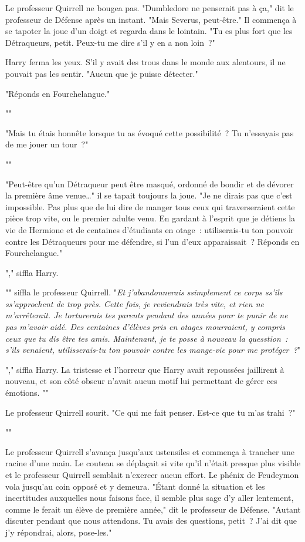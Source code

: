 Le professeur Quirrell ne bougea pas. "Dumbledore ne penserait pas à ça," dit le professeur de Défense après un instant. "Mais Severus, peut-être." Il commença à se tapoter la joue d'un doigt et regarda dans le lointain. "Tu es plus fort que les Détraqueurs, petit. Peux-tu me dire s'il y en a non loin~?"

Harry ferma les yeux. S'il y avait des trous dans le monde aux alentours, il ne pouvait pas les sentir. "Aucun que je puisse détecter."

"Réponds en Fourchelangue."

""

"Mais tu étais honnête lorsque tu as évoqué cette possibilité~? Tu n'essayais pas de me jouer un tour~?"

""

"Peut-être qu'un Détraqueur peut être masqué, ordonné de bondir et de dévorer la première âme venue…" il se tapait toujours la joue. "Je ne dirais pas que c'est impossible. Pas plus que de lui dire de manger tous ceux qui traverseraient cette pièce trop vite, ou le premier adulte venu. En gardant à l'esprit que je détiens la vie de Hermione et de centaines d'étudiants en otage~: utiliserais-tu ton pouvoir contre les Détraqueurs pour me défendre, si l'un d'eux apparaissait~? Réponds en Fourchelangue."

"," siffla Harry.

"" siffla le professeur Quirrell. "\emph{Et j'abandonnerais ssimplement ce corps ss'ils ss'approchent de trop près. Cette fois, je reviendrais très vite, et rien ne m'arrêterait. Je torturerais tes parents pendant des années pour te punir de ne pas m'avoir aidé. Des centaines d'élèves pris en otages mourraient, y compris ceux que tu dis être tes amis. Maintenant, je te posse à nouveau la quesstion~: s'ils venaient, utilisserais-tu ton pouvoir contre les mange-vie pour me protéger~?}"

"," siffla Harry. La tristesse et l'horreur que Harry avait repoussées jaillirent à nouveau, et son côté obscur n'avait aucun motif lui permettant de gérer ces émotions. ""

Le professeur Quirrell sourit. "Ce qui me fait penser. Est-ce que tu m'as trahi~?"

""

Le professeur Quirrell s'avança jusqu'aux ustensiles et commença à trancher une racine d'une main. Le couteau se déplaçait si vite qu'il n'était presque plus visible et le professeur Quirrell semblait n'exercer aucun effort. Le phénix de Feudeymon vola jusqu'au coin opposé et y demeura. "Étant donné la situation et les incertitudes auxquelles nous faisons face, il semble plus sage d'y aller lentement, comme le ferait un élève de première année," dit le professeur de Défense. "Autant discuter pendant que nous attendons. Tu avais des questions, petit~? J'ai dit que j'y répondrai, alors, pose-les." 

